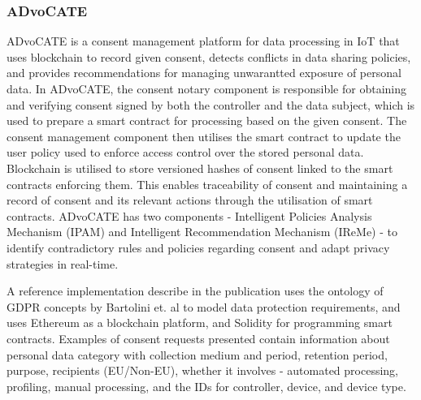 \subsubsection{ADvoCATE}
ADvoCATE \cite{rantos_advocate:_2019} is a consent management platform for data processing in IoT that uses blockchain to record given consent, detects conflicts in data sharing policies, and provides recommendations for managing unwarantted exposure of personal data. In ADvoCATE, the consent notary component is responsible for obtaining and verifying consent signed by both the controller and the data subject, which is used to prepare a smart contract for processing based on the given consent. The consent management component then utilises the smart contract to update the user policy used to enforce access control over the stored personal data. Blockchain is utilised to store versioned hashes of consent linked to the smart contracts enforcing them. This enables traceability of consent and maintaining a record of consent and its relevant actions through the utilisation of smart contracts.
ADvoCATE has two components - Intelligent Policies Analysis Mechanism (IPAM) and Intelligent Recommendation Mechanism (IReMe) - to identify contradictory rules and policies regarding consent and adapt privacy strategies in real-time. 

A reference implementation describe in the publication uses the ontology of GDPR concepts by Bartolini et. al \cite{bartolini_using_2015} to model data protection requirements, and uses Ethereum as a blockchain platform, and Solidity for programming smart contracts. Examples of consent requests presented contain information about personal data category with collection medium and period, retention period, purpose, recipients (EU/Non-EU), whether it involves - automated processing, profiling, manual processing, and the IDs for controller, device, and device type.

